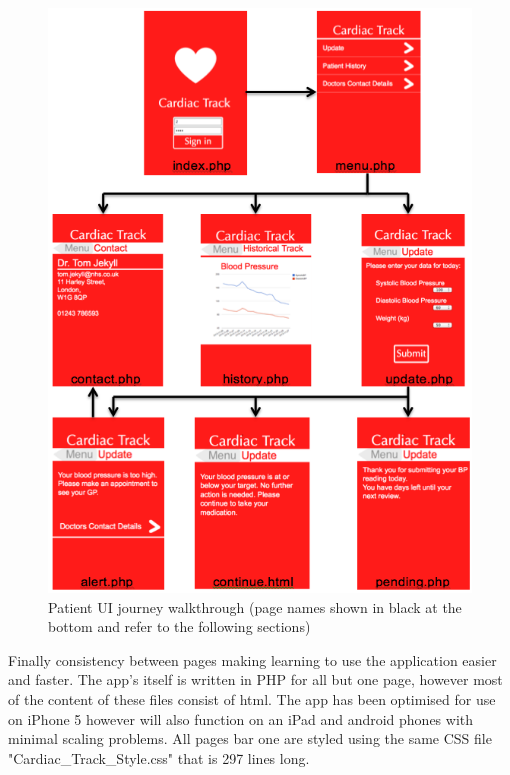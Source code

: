 \documentclass[11pt]{article}
\begin{document}
\begin{figure}
\centering
\includegraphics[width=1\linewidth]{patientUI.png}
\caption{Patient UI journey walkthrough (page names shown in black at the bottom and refer to the following sections) \label{patientUI}}
\end{figure} 
Finally consistency between pages making learning to use the application easier and faster. The app's itself is written in PHP for all but one page, however most of the content of these files consist of html. The app has been optimised for use on iPhone 5 however will also function on an iPad and android phones with minimal scaling problems. All pages bar one are styled using the same CSS file "Cardiac\_Track\_Style.css" that is 297 lines long. 
\end{document}
